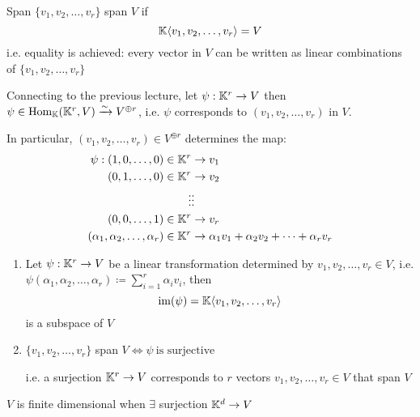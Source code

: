

\begin{definition} {Span}
    \(\{v_1, v_2, \dots, v_r\}\) span \(V\) if \[
    \mathbb{K}\langle v_1, v_2, \dots, v_r \rangle = V
    \]
    i.e. equality is achieved: every vector in \(V\) can be written as linear combinations of \(\{v_1, v_2, \dots, v_r\}\)
\end{definition}

Connecting to the previous lecture, let \(\psi: \mathbb{K}^r \to V\) then \(\psi \in \mathrm{Hom}_{\mathbb{K}}(\mathbb{K}^r, V) \xrightarrow{\sim} V^{\oplus r}\), i.e. \(\psi\) corresponds to \((v_1, v_2, \dots, v_r)\) in \(V\).

In particular, \((v_1, v_2, \dots, v_r) \in V^{\oplus r}\) determines the map:
\begin{align*}
    \psi: (1, 0, \dots, 0) \in \mathbb{K}^r &\to v_1 \\
    (0, 1, \dots, 0) \in \mathbb{K}^r &\to v_2 \\
    \vdots & \vdots \\
    (0, 0, \dots, 1) \in \mathbb{K}^r &\to v_r \\
    (\alpha_1, \alpha_2, \dots, \alpha_r) \in \mathbb{K}^r &\to \alpha_1v_1 + \alpha_2v_2 + \dots + \alpha_rv_r
\end{align*}

\begin{lemma}
    \hfill
    \begin{enumerate}
        \item Let \(\psi: \mathbb{K}^r \to V\) be a linear transformation determined by \(v_1, v_2, \dots, v_r \in V\), i.e. \(\psi(\alpha_1, \alpha_2, \dots, \alpha_r) \coloneqq \sum_{i=1}^r \alpha_iv_i\), then \[
        \mathrm{im}(\psi) = \mathbb{K}\langle v_1, v_2, \dots, v_r \rangle
        \] is a subspace of \(V\)
        \item \(\{v_1, v_2, \dots, v_r\}\) span \(V \Leftrightarrow \psi \:\text{is surjective}\: \) 

        i.e. a surjection \(\mathbb{K}^r \to V\) corresponds to \(r\) vectors \(v_1, v_2, \dots, v_r \in V\) that span \(V\)
    \end{enumerate}
\end{lemma}

\begin{remark}
    \(V\) is finite dimensional when \(\exists\) surjection \(\mathbb{K}^d \to V\) 
\end{remark}

